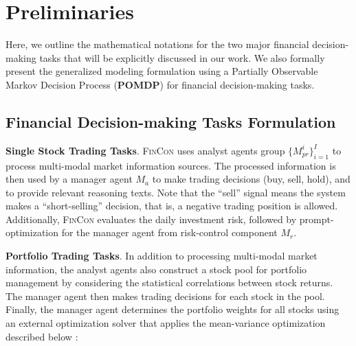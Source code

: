 \section{Preliminaries}
Here, we outline the mathematical notations for the two major financial decision-making tasks that will be explicitly discussed in our work. We also formally present the generalized modeling formulation using a Partially Observable Markov Decision Process (\textbf{POMDP}) \cite{spaan2012partially} for financial decision-making tasks.  

\subsection{Financial Decision-making Tasks Formulation}
\textbf{Single Stock Trading Tasks}. \textsc{FinCon} uses analyst agents group $\{M_{pr}^i\}_{i=1}^{I}$ to process multi-modal market information sources. The processed information is then used by a manager agent $M_a$ to make trading decisions (buy, sell, hold), and to provide relevant reasoning texts. Note that the ``sell'' signal means the system makes a ``short-selling'' decision, that is, a negative trading position is allowed. Additionally, \textsc{FinCon} evaluates the daily investment risk, followed by prompt-optimization for the manager agent from risk-control component $M_r$.

\textbf{Portfolio Trading Tasks}. In addition to processing multi-modal market information, the analyst agents also construct a stock pool for portfolio management by considering the statistical correlations between stock returns. The manager agent then makes trading decisions for each stock in the pool. Finally, the manager agent determines the portfolio weights for all stocks using an external optimization solver that applies the mean-variance optimization described below \cite{fabozzi2008portfolio}:

